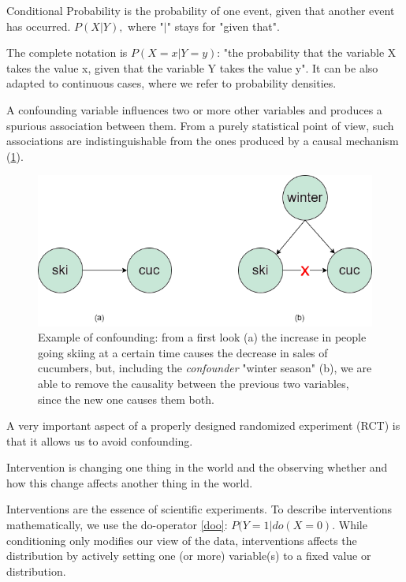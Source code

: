 \begin{definition}
    Conditional Probability is the probability of one event, given that another event has occurred. $P(X|Y),$ where "$|$" stays for "given that".
\end{definition}
The complete notation is $P(X = x|Y = y)$: "the probability that the variable X takes the value x, given that the variable Y takes the value y". It can be also adapted to continuous cases, where we refer to probability densities.
\begin{definition}[Confounding]
    A confounding variable influences two or more other variables and produces a spurious association between them. From a purely statistical point of view, such associations are indistinguishable from the ones produced by a causal mechanism (\ref{fig6}).
\end{definition}

\begin{figure}[!h]
    \centering
    \includegraphics[width=0.7\linewidth]{chapters/Images/confounding.drawio.png}
    \caption{Example of confounding: from a first look (a) the increase in people going skiing at a certain time causes the decrease in sales of cucumbers, but, including the \textit{confounder} "winter season" (b), we are able to remove the causality between the previous two variables, since the new one causes them both.}
    \label{fig6}
\end{figure}

A very important aspect of a properly designed randomized experiment (RCT) is that it allows us to avoid confounding.
\begin{definition}[Intervention]\label{int}
     Intervention is changing one thing in the world and the observing whether and how this change affects another thing in the world.
\end{definition}

Interventions are the essence of scientific experiments. To describe interventions mathematically, we use the do-operator \ref{doo}: $P(Y = 1 | do(X = 0)$. While conditioning only modifies our view of the data, interventions affects the distribution by actively setting one (or more) variable(s) to a fixed value or distribution. \cite{molak2023causal}

